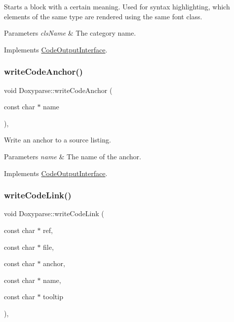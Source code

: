 Starts a block with a certain meaning. Used for syntax highlighting, which elements of the same type are rendered using the same \textquotesingle{}font class\textquotesingle{}. 
\begin{DoxyParams}{Parameters}
{\em cls\+Name} & The category name. \\
\hline
\end{DoxyParams}


Implements \mbox{\hyperlink{class_code_output_interface_ac90f75968cdcf127e0b02938bdb49d87}{Code\+Output\+Interface}}.

\mbox{\label{class_doxyparse_a43aa79498085a47fcd0c122898133b20}} 
\subsubsection{\texorpdfstring{writeCodeAnchor()}{writeCodeAnchor()}}
{\footnotesize\ttfamily void Doxyparse\+::write\+Code\+Anchor (\begin{DoxyParamCaption}\item[{const char $\ast$}]{name }\end{DoxyParamCaption})\hspace{0.3cm}{\ttfamily [inline]}, {\ttfamily [virtual]}}

Write an anchor to a source listing. 
\begin{DoxyParams}{Parameters}
{\em name} & The name of the anchor. \\
\hline
\end{DoxyParams}


Implements \mbox{\hyperlink{class_code_output_interface_a1f6394c4ef7c4143de90bcaf3a65c0b4}{Code\+Output\+Interface}}.

\mbox{\label{class_doxyparse_adfe22a536eefa84ac8de7dd3492a50b6}} 
\subsubsection{\texorpdfstring{writeCodeLink()}{writeCodeLink()}}
{\footnotesize\ttfamily void Doxyparse\+::write\+Code\+Link (\begin{DoxyParamCaption}\item[{const char $\ast$}]{ref,  }\item[{const char $\ast$}]{file,  }\item[{const char $\ast$}]{anchor,  }\item[{const char $\ast$}]{name,  }\item[{const char $\ast$}]{tooltip }\end{DoxyParamCaption})\hspace{0.3cm}{\ttfamily [inline]}, {\ttfamily [virtual]}}

